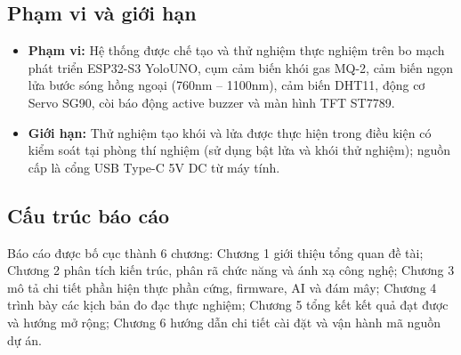 \subsection{Phạm vi và giới hạn}
\begin{itemize}
    \item \textbf{Phạm vi:} Hệ thống được chế tạo và thử nghiệm thực nghiệm trên bo mạch phát triển ESP32-S3 YoloUNO, cụm cảm biến khói gas MQ-2, cảm biến ngọn lửa bước sóng hồng ngoại (760nm -- 1100nm), cảm biến DHT11, động cơ Servo SG90, còi báo động active buzzer và màn hình TFT ST7789.
    \item \textbf{Giới hạn:} Thử nghiệm tạo khói và lửa được thực hiện trong điều kiện có kiểm soát tại phòng thí nghiệm (sử dụng bật lửa và khói thử nghiệm); nguồn cấp là cổng USB Type-C 5V DC từ máy tính.
\end{itemize}

\subsection{Cấu trúc báo cáo}
Báo cáo được bố cục thành 6 chương: Chương 1 giới thiệu tổng quan đề tài; Chương 2 phân tích kiến trúc, phân rã chức năng và ánh xạ công nghệ; Chương 3 mô tả chi tiết phần hiện thực phần cứng, firmware, AI và đám mây; Chương 4 trình bày các kịch bản đo đạc thực nghiệm; Chương 5 tổng kết kết quả đạt được và hướng mở rộng; Chương 6 hướng dẫn chi tiết cài đặt và vận hành mã nguồn dự án.
\newpage
